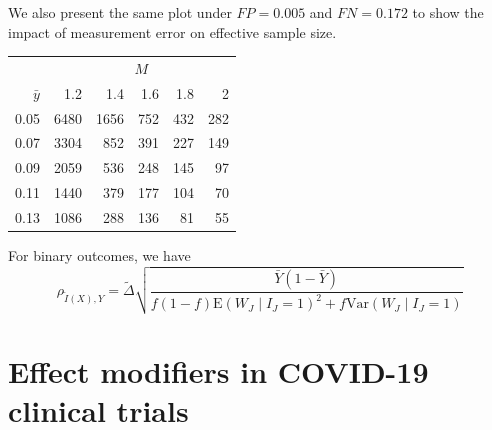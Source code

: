 \documentclass[11pt]{amsart}
\numberwithin{equation}{section}
\theoremstyle{plain}
\begin{document}
We also present the same plot under $FP = 0.005$ and $FN = 0.172$ to show the impact of measurement error on effective sample size.

\begin{table}[ht]
\centering
\begin{tabular}{rrrrrr}
& \multicolumn{5}{c}{$M$} \\ \cline{2-6}
$\bar y$ & 1.2 & 1.4 & 1.6 & 1.8 & 2 \\
  \hline
0.05 & 6480 & 1656 & 752 & 432 & 282 \\
  0.07 & 3304 & 852 & 391 & 227 & 149 \\
  0.09 & 2059 & 536 & 248 & 145 & 97 \\
  0.11 & 1440 & 379 & 177 & 104 & 70 \\
  0.13 & 1086 & 288 & 136 & 81 & 55 \\
   \hline
\end{tabular}
\end{table}

For binary outcomes, we have
\begin{equation} \label{eq:binaryrho}
\rho_{\tilde I (X),Y} = \tilde \Delta \sqrt{\frac{\bar Y (1 - \bar Y)}{f (1-f) \text{E}(W_J \mid I_J = 1)^2 + f \text{Var}(W_J \mid I_J = 1)} }
\end{equation}

\section{Effect modifiers in COVID-19 clinical trials}
\end{document}
